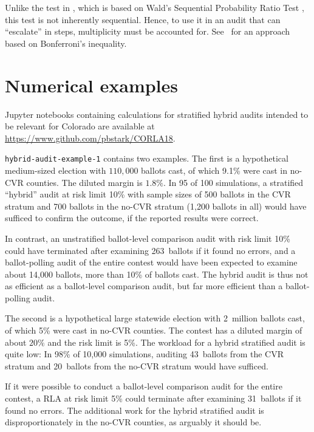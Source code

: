\documentclass[runningheads]{llncs}
\newcommand{\comment}[1]{\textcolor{red}{\sc #1}}
\begin{document}
Unlike the test in \cite{lindemanEtal12}, which is based on Wald's Sequential Probability Ratio Test \cite{wald45}, this test is not inherently sequential.
Hence, to use it in an audit that can ``escalate'' in steps, multiplicity must be accounted for. See~\cite{stark08a,stark09a} for an approach based on Bonferroni's inequality.


\section{Numerical examples}\label{sec:examples}


Jupyter notebooks containing calculations for stratified hybrid audits intended to be relevant for Colorado are available at \url{https://www.github.com/pbstark/CORLA18}.

\texttt{hybrid-audit-example-1} contains two examples. 
The first is a hypothetical medium-sized election with 
$110,000$ ballots cast, of which 
9.1\% were cast in no-CVR counties. 
The diluted margin is $1.8\%$.
In 95 of 100 simulations, a stratified ``hybrid'' audit at risk limit 10\% with sample sizes of 500 ballots 
in the CVR stratum and 700 ballots in the no-CVR stratum
(1,200 ballots in all)
would have sufficed to confirm the outcome, if the reported results were correct.

In contrast, an unstratified ballot-level comparison audit with risk limit 10\% could have terminated
after examining 263~ballots if it found no errors, and a ballot-polling audit of the entire contest 
would have been expected to examine about 14,000 ballots, more than 10\% of ballots cast.
The hybrid audit is thus not as efficient as a ballot-level comparison audit, but far more efficient than a ballot-polling audit.

The second is a hypothetical large statewide election with 
2~million ballots cast, of which 5\% were cast in no-CVR counties.
The contest has a diluted margin of about $20\%$ and the risk limit is 5\%.
The workload for a hybrid stratified audit is quite low:
In 98\% of 10,000 simulations, auditing 43~ballots from the 
CVR stratum and 20~ballots from the no-CVR stratum
would have sufficed.

If it were possible to conduct a ballot-level comparison audit for the entire contest, 
a RLA at risk limit 5\% could terminate after examining 31~ballots if it found no errors.
The additional work for the hybrid stratified audit is disproportionately in the no-CVR counties, as
arguably it should be.
\end{document}
